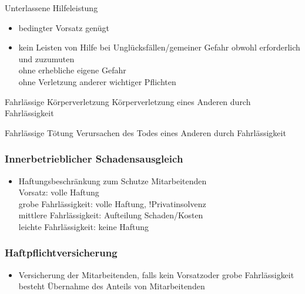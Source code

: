 \begin{hintbox}{Unterlassene Hilfeleistung}
    \begin{itemize}
        \item bedingter Vorsatz genügt
        \item kein Leisten von Hilfe bei Unglücksfällen/gemeiner Gefahr obwohl erforderlich und zuzumuten\\
        \ra ohne erhebliche eigene Gefahr\\
        \ra ohne Verletzung anderer wichtiger Pflichten
    \end{itemize}
\end{hintbox}
\begin{hintbox}{Fahrlässige Körperverletzung}
    Körperverletzung eines Anderen durch Fahrlässigkeit
\end{hintbox}
\begin{hintbox}{Fahrlässige Tötung}
    Verursachen des Todes eines Anderen durch Fahrlässigkeit
\end{hintbox}
\begin{normbox}{\subsubsection{Innerbetrieblicher Schadensausgleich}}
    \begin{itemize}
        \item Haftungsbeschränkung zum Schutze Mitarbeitenden\\
        \ra Vorsatz: volle Haftung\\
        \ra grobe Fahrlässigkeit:  volle Haftung, !Privatinsolvenz\\
        \ra mittlere Fahrlässigkeit: Aufteilung Schaden/Kosten\\
        \ra leichte Fahrlässigkeit: keine Haftung
    \end{itemize}
\end{normbox}
\begin{normbox}{\subsubsection{Haftpflichtversicherung}}
    \begin{itemize}
        \item Versicherung der Mitarbeitenden, falls kein Vorsatzoder grobe Fahrlässigkeit besteht
        \ra Übernahme des Anteils von Mitarbeitenden
    \end{itemize}
\end{normbox}
